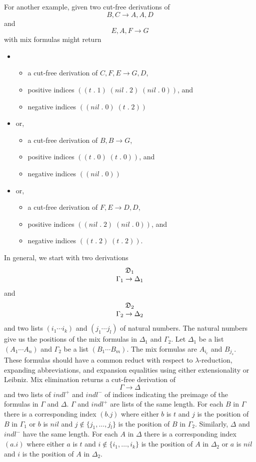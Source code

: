 For another example, given two cut-free derivations of
$$B,C\rightarrow A,A,D$$
and
$$E,A,F\rightarrow G$$
with mix formulas
might return
\begin{itemize}
\item
\begin{itemize}
\item a cut-free derivation of $C,F,E\rightarrow G,D$,
\item positive indices $((t\; .\; 1)\; (nil\; .\; 2)\; (nil \; . \; 0))$,
and
\item negative indices $((nil\; . \;0)\; (t\; . \; 2))$
\end{itemize}
\item or,
\begin{itemize}
\item a cut-free derivation of $B,B\rightarrow G$,
\item positive indices $((t\; . \;0)\; (t\; . \; 0))$, and
\item negative indices $((nil \; . \; 0))$
\end{itemize}
\item or,
\begin{itemize}
\item a cut-free derivation of $F,E\rightarrow D,D$,
\item positive indices $((nil\; . \; 2)\; (nil\; . \; 0))$, and
\item negative indices $((t\; . \; 2)\; (t \; . \; 2))$.
\end{itemize}
\end{itemize}

In general, we start with two derivations
$$\begin{array}[b]{c}\relax {\mathfrak D}_1\\ \relax \Gamma_1\rightarrow \Delta_1\end{array}$$
and
$$\begin{array}[b]{c}\relax {\mathfrak D}_2\\ \relax \Gamma_2\rightarrow \Delta_2\end{array}$$
and two lists $(i_1\cdots i_k)$ and $(j_1\cdots j_l)$
of natural numbers.  The natural numbers give us
the positions of the mix formulas in $\Delta_1$ and $\Gamma_2$.
Let $\Delta_1$ be a list
$(A_1 \cdots A_n)$ and $\Gamma_2$ be a list
$(B_1 \cdots B_m)$.  The mix formulas are
$A_{i_r}$ and $B_{j_s}$.  These formulas should have
a common reduct with respect to $\lambda$-reduction,
expanding abbreviations, and expansion equalities
using either extensionality or Leibniz.
Mix elimination returns a cut-free derivation of
$$\Gamma\rightarrow\Delta$$
and two lists of $indl^+$ and $indl^-$
of indices indicating the preimage of
the formulas in $\Gamma$ and $\Delta$.
$\Gamma$ and $indl^+$ are lists of the same length.
For each $B$ in $\Gamma$ there is a corresponding
index $(b . j)$ where either $b$ is $t$
and $j$ is the position of $B$ in $\Gamma_1$
or $b$ is $nil$ and $j\not\in\{j_1,\ldots, j_l\}$ is the position of
$B$ in $\Gamma_2$.
Similarly, $\Delta$ and $indl^-$ have the same length.
For each $A$ in $\Delta$ there is a corresponding index
$(a . i)$ where either $a$ is $t$ and $i\not\in\{i_1,\ldots, i_k\}$ is the position
of $A$ in $\Delta_2$
or $a$ is $nil$ and $i$ is the position of $A$ in $\Delta_2$.

